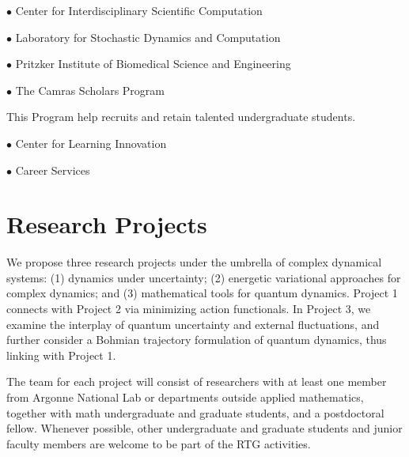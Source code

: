 \documentclass[11pt]{NSFamsart}
\newcommand{\FredNote}[1]{{\color{blue} Fred: #1}}
\begin{document}
 $\bullet$ Center for Interdisciplinary Scientific Computation
 
 $\bullet$ Laboratory for Stochastic Dynamics and Computation
 
 $\bullet$ Pritzker Institute of Biomedical Science and Engineering
 
  $\bullet$  The Camras Scholars Program
  
  This Program help recruits and retain talented undergraduate students. 
  
  $\bullet$  Center for Learning Innovation 
 
 
 $\bullet$   Career Services
 \fi
 
 
 




\section{Research Projects } 

We propose three research projects under the umbrella of complex dynamical systems: (1) dynamics under uncertainty; (2) energetic variational approaches for complex dynamics; and (3) mathematical tools for quantum dynamics. Project 1 connects with Project 2 via minimizing action functionals. In Project 3, we examine the interplay of quantum uncertainty and external fluctuations, and further consider a Bohmian trajectory formulation of quantum dynamics, thus linking with Project 1. 

The team for each project will consist of researchers with at least one member
from Argonne National Lab or departments outside applied mathematics,   together with math undergraduate and graduate students, and a postdoctoral
fellow. Whenever possible, other undergraduate and graduate students and junior faculty members are welcome to   be part of the RTG activities. 

\iffalse  
 While there   may be thematic driven differences on the approach to deliver
knowledge and do research, each group share a similar year-round schedule that will allow awareness
and exchange of ideas throughout the academic year, mainly at the RTG graduate seminar.   Finally each summer program is centered on
an intense 2-week period. \FredNote{What does this mean?} Participating undergraduates will have a unique opportunity to work in a serious
way on two topics, which we believe to be highly beneficial.
\fi
 
\end{document}
